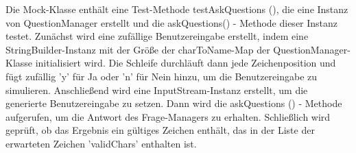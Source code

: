 Die Mock-Klasse enthält eine Test-Methode testAskQuestions (), die eine Instanz von QuestionManager erstellt und die askQuestions() - Methode dieser Instanz testet. Zunächst wird eine zufällige Benutzereingabe erstellt, indem eine StringBuilder-Instanz mit der Größe der charToName-Map der QuestionManager-Klasse initialisiert wird. Die Schleife durchläuft dann jede Zeichenposition und fügt zufällig 'y' für Ja oder 'n' für Nein hinzu, um die Benutzereingabe zu simulieren. Anschließend wird eine InputStream-Instanz erstellt, um die generierte Benutzereingabe zu setzen. Dann wird die askQuestions () - Methode aufgerufen, um die Antwort des Frage-Managers zu erhalten. Schließlich wird geprüft, ob das Ergebnis ein gültiges Zeichen enthält, das in der Liste der erwarteten Zeichen 'validChars' enthalten ist.